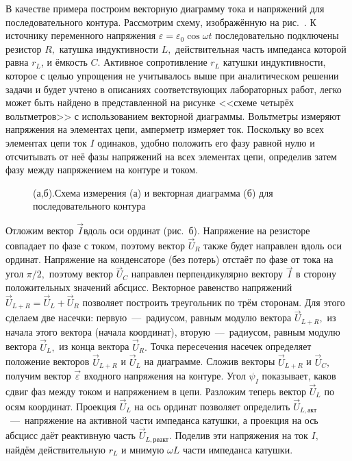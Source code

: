 В качестве примера построим векторную диаграмму тока и напряжений для последовательного контура. Рассмотрим схему, изображённую на рис.~. К источнику переменного напряжения $\varepsilon=\varepsilon_0\cos\omega t$ последовательно подключены резистор $R,$ катушка индуктивности $L,$ действительная часть импеданса которой равна $r_L$, и ёмкость $C.$ Активное сопротивление $r_L$ катушки индуктивности, которое с целью упрощения не учитывалось выше при аналитическом решении задачи и будет учтено в описаниях соответствующих лабораторных работ, легко может быть найдено в представленной на рисунке <<схеме четырёх вольтметров>> с использованием векторной диаграммы. Вольтметры измеряют напряжения на элементах цепи, амперметр измеряет ток. Поскольку во всех элементах цепи ток $I$ одинаков, удобно положить его фазу равной нулю и отсчитывать от неё фазы напряжений на всех элементах цепи, определив затем фазу   между напряжением на контуре и током.

\begin{figure}[h]
	\begin{minipage}[h]{0.37\linewidth}
	\end{minipage}
	\hfill
	\begin{minipage}[h]{0.49\linewidth}
	\end{minipage}
	\caption{(а,б).Схема измерения (а) и векторная  диаграмма (б) для последовательного контура}
\end{figure}

Отложим вектор $\vec I$вдоль оси ординат (рис.~б). Напряжение на резисторе совпадает по фазе с током, поэтому вектор $\vec U_R$ также будет направлен вдоль оси ординат. Напряжение на конденсаторе (без потерь) отстаёт по фазе от тока на угол $\pi/2,$ поэтому вектор $\vec U_C$ направлен перпендикулярно вектору $\vec I$ в сторону положительных значений абсцисс. Векторное равенство напряжений $\vec U_{L+R}=\vec U_L+\vec U_R$ позволяет построить треугольник по трём сторонам. Для этого сделаем две насечки: первую~---~радиусом, равным модулю вектора $\vec U_{L+R},$ из начала этого вектора (начала координат), вторую~---~радиусом, равным модулю вектора $\vec U_L,$ из конца вектора $\vec U_R.$ Точка пересечения насечек определяет положение векторов $\vec U_{L+R}$ и $\vec U_L$ на диаграмме. Сложив векторы $\vec U_{L+R}$ и $\vec U_C,$ получим вектор $\vec\varepsilon$ входного напряжения на контуре. Угол $\psi_I$ показывает, каков сдвиг фаз между током и напряжением в цепи. Разложим теперь вектор $\vec U_L$ по осям координат. Проекция $\vec U_L$ на ось ординат позволяет определить $\vec U_{L,\text{акт}}$~---~напряжение на активной части импеданса катушки, а проекция на ось абсцисс даёт реактивную часть $\vec U_{L,\text{реакт}}.$ Поделив эти напряжения на ток $I,$ найдём действительную $r_L$ и мнимую $\omega L$ части импеданса катушки.

